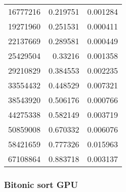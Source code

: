 \begin{longtable}{r r r}
16777216 & 0.219751 & 0.001284 \\
19271960 & 0.251531 & 0.000411 \\
22137669 & 0.289581 & 0.000449 \\
25429504 & 0.33216 & 0.001358 \\
29210829 & 0.384553 & 0.002235 \\
33554432 & 0.448529 & 0.007321 \\
38543920 & 0.506176 & 0.000766 \\
44275338 & 0.582149 & 0.003719 \\
50859008 & 0.670332 & 0.006076 \\
58421659 & 0.777326 & 0.015963 \\
67108864 & 0.883718 & 0.003137 \\
\end{longtable}

\subsubsection{Bitonic sort GPU}

